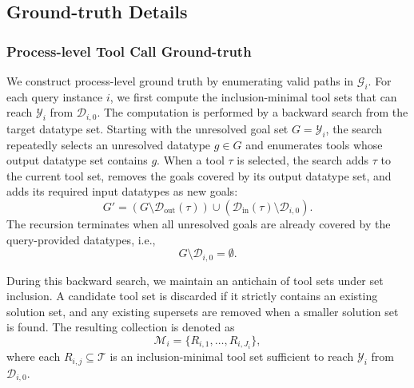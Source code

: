 \subsection{Ground-truth Details}
\label{app:groundtruth-details}

\subsubsection{Process-level Tool Call Ground-truth}
\label{app:process-level-groundtruth}

We construct process-level ground truth by enumerating valid paths in $\mathcal{G}_i$. 
For each query instance $i$, we first compute the inclusion-minimal tool sets that can reach 
$\mathcal{Y}_i$ from $\mathcal{D}_{i,0}$.
The computation is performed by a backward search from the target datatype set. 
Starting with the unresolved goal set $G=\mathcal{Y}_i$, the search repeatedly selects an unresolved datatype $g \in G$ and enumerates tools whose output datatype set contains $g$.
When a tool $\tau$ is selected, the search adds $\tau$ to the current tool set, removes the goals covered by its output datatype set, and adds its required input datatypes as new goals:
\begin{equation}
G' = 
(G \setminus \mathcal{D}_{\mathrm{out}}(\tau)) 
\cup 
(\mathcal{D}_{\mathrm{in}}(\tau) \setminus \mathcal{D}_{i,0}).
\end{equation}
The recursion terminates when all unresolved goals are already covered by the query-provided datatypes, i.e.,
\begin{equation}
G \setminus \mathcal{D}_{i,0} = \emptyset.
\end{equation}

During this backward search, we maintain an antichain of tool sets under set inclusion. 
A candidate tool set is discarded if it strictly contains an existing solution set, and any existing supersets are removed when a smaller solution set is found. 
The resulting collection is denoted as
\begin{equation}
\mathcal{M}_i = \{R_{i,1},\ldots,R_{i,J_i}\},
\end{equation}
where each $R_{i,j} \subseteq \mathcal{T}$ is an inclusion-minimal tool set sufficient to reach $\mathcal{Y}_i$ from $\mathcal{D}_{i,0}$.

